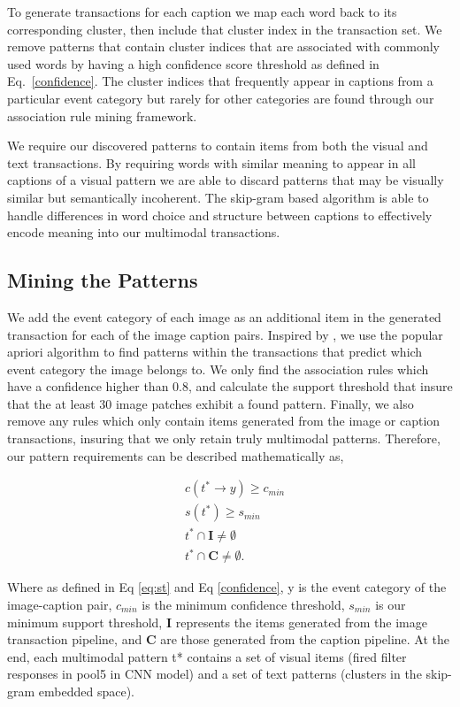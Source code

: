 \documentclass[10pt,twocolumn,letterpaper]{article}
\begin{document}
{To generate transactions for each caption we map each word back to its corresponding cluster, then include that cluster index in the transaction set.
We remove patterns that contain cluster indices that are associated with commonly used words by having a high confidence score threshold as defined in Eq.~\ref{confidence}.
The cluster indices that frequently appear in captions from a particular event category but rarely for other categories are found through our association rule mining framework.

We require our discovered patterns to contain items from both the visual and text transactions.
By requiring words with similar meaning to appear in all captions of a visual pattern we are able to discard patterns that may be visually similar but semantically incoherent.
The skip-gram based algorithm is able to handle differences in word choice and structure between captions to effectively encode meaning into our multimodal transactions.

\subsection{Mining the Patterns}
We add the event category of each image as an additional item in the generated transaction for each of the image caption pairs.
Inspired by \cite{LiLSH15CVPR}, we use the popular apriori algorithm \cite{Agrawal:1994:FAM:645920.672836} to find patterns within the transactions that predict which event category the image belongs to.
We only find the association rules which have a confidence higher than $0.8$, and calculate the support threshold that insure that the at least $30$ image patches exhibit a found pattern.
Finally, we also remove any rules which only contain items generated from the image or caption transactions, insuring that we only retain truly multimodal patterns.
Therefore, our pattern requirements can be described mathematically as,

\begin{align}
&c(t^* \rightarrow y) \geq c_{min} \nonumber \\
&s(t^*) \geq s_{min} \nonumber \\
&t^* \cap \mathbf{I} \neq \emptyset \nonumber \\
&t^* \cap \mathbf{C} \neq \emptyset.
\label{eq:contstraints}
\end{align}

Where as defined in Eq \ref{eq:st} and Eq \ref{confidence}, y is the event category of the image-caption pair, $c_{min}$ is the minimum confidence threshold, $s_{min}$ is our minimum support threshold, $\mathbf{I}$ represents the items generated from the image transaction pipeline, and $\mathbf{C}$ are those generated from the caption pipeline. At the end, each multimodal pattern t* contains a set of visual items (fired filter responses in pool5 in CNN model) and a set of text patterns (clusters in the skip-gram embedded space).

}
\end{document}
